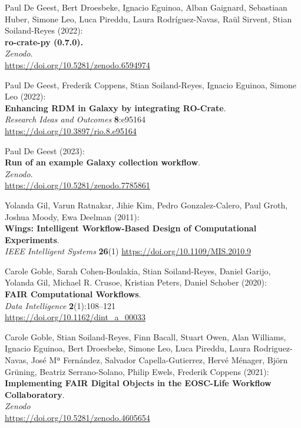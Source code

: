 \documentclass[10pt,letterpaper]{article}
\begin{document}
\begin{thebibliography}{10}
\begin{small}
Paul De Geest, Bert Droesbeke, Ignacio Eguinoa,
Alban Gaignard, Sebastiaan Huber, Simone Leo, Luca Pireddu,
Laura Rodríguez-Navas, Raül Sirvent, Stian Soiland-Reyes (2022):\\
\textbf{ro-crate-py (0.7.0).}\\
\emph{Zenodo}.\\
\url{https://doi.org/10.5281/zenodo.6594974}

 Paul De Geest, Frederik Coppens, Stian Soiland-Reyes, Ignacio Eguinoa, Simone Leo (2022):\\
\textbf{Enhancing RDM in Galaxy by integrating RO-Crate}.\\
\emph{Research Ideas and Outcomes} \textbf{8}:e95164\\
\url{https://doi.org/10.3897/rio.8.e95164}

Paul De Geest (2023):\\
\textbf{Run of an example Galaxy collection workflow}.\\
\emph{Zenodo}.\\
\url{https://doi.org/10.5281/zenodo.7785861}

Yolanda Gil, Varun Ratnakar, Jihie Kim, Pedro Gonzalez-Calero, Paul Groth, Joshua Moody, Ewa Deelman (2011):\\
\textbf{Wings: Intelligent Workflow-Based Design of Computational Experiments}.\\
\emph{IEEE Intelligent Systems} \textbf{26}(1)
\url{https://doi.org/10.1109/MIS.2010.9}

Carole Goble, Sarah Cohen-Boulakia, Stian Soiland-Reyes, Daniel Garijo, Yolanda Gil, Michael R. Crusoe, Kristian Peters, Daniel Schober (2020):\\
\textbf{FAIR Computational Workflows}.\\
\emph{Data Intelligence} \textbf{2}(1):108--121\\
\url{https://doi.org/10.1162/dint_a_00033}

Carole Goble, Stian Soiland-Reyes, Finn Bacall, Stuart Owen, Alan Williams, Ignacio Eguinoa, Bert Droesbeke, Simone Leo, Luca Pireddu, Laura Rodriguez-Navas, José Mª Fernández, Salvador Capella-Gutierrez, Hervé Ménager, Björn Grüning, Beatriz Serrano-Solano, Philip Ewels, Frederik Coppens (2021):\\
\textbf{Implementing FAIR Digital Objects in the EOSC-Life Workflow Collaboratory}.\\
\emph{Zenodo}\\
\url{https://doi.org/10.5281/zenodo.4605654}


\end{small}
\end{thebibliography}
\end{document}
